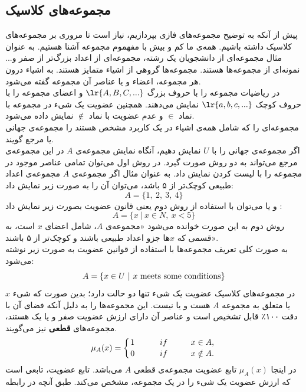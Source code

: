 \documentclass[12pt,a4paper]{article}
\theoremstyle{definition}
\begin{document}
 \subsection{مجموعه‌های کلاسیک}
پیش از آنکه به توضیح مجموعه‌های فازی بپردازیم، نیاز است تا مروری بر مجموعه‌های کلاسیک داشته باشیم. همه‌ی ما کم و بیش با مفهموم مجموعه آشنا هستیم. به عنوان مثال مجموعه‌ای از دانشجویان یک رشته، مجموعه‌ای از اعداد بزرگ‌تر از صفر و... نمونه‌ای از مجموعه‌ها هستند. مجموعه‌ها گروهی از اشیاء متمایز هستند. به اشیاء درون هر مجموعه، اعضاء و یا عناصر آن مجموعه گفته می‌شود. \\
در ریاضیات مجموعه را با حروف بزرگ 
$\lr{A,B,C,...}$
 و اعضای مجموعه را با حروف کوچک 
$\lr{a,b,c,...} $
  نمایش می‌دهند. همچنین عضویت یک شیء در مجموعه با نماد 
$\in$
 و عدم عضویت با نماد
 $\notin$
 نمایش داده می‌شود. 
 \cite{Bojadziev2007}
 \\
مجموعه‌ای را که شامل همه‌ی اشیاء در یک کاربرد مشخص هستند را مجموعه‌ی جهانی 
یا مرجع گویند. \\
اگر مجموعه‌ی جهانی را با $ U $  نمایش دهیم، آنگاه نمایش مجموعه‌ی $ A $  در این مجموعه‌ی مرجع می‌تواند به دو روش صورت گیرد. در روش اول می‌توان تمامی عناصر موجود در مجموعه را با لیست کردن 
نمایش داد. به عنوان مثال اگر مجموعه‌ی $ A $ مجموعه‌ی اعداد طبیعی کوچک‌تر از ۵ باشد، می‌توان آن را به صورت زیر نمایش داد:
$$ A=\{1,\ 2,\ 3,\ 4\} $$
و یا می‌توان با استفاده از روش دوم یعنی قانون عضویت
بصورت زیر نمایش داد
\cite{Wang1997}:
 $$A= \{ x\ |\ x \in N,\ x < 5\} $$
 روش دوم به این صورت خوانده می‌شود «مجموعه‌ی $ A $، شامل اعضای $ x $ است، به قسمی که  $ x $ها جزو اعداد طبیعی باشند و کوچک‌تر از ۵ باشند».\\
 به صورت کلی تعریف مجموعه‌ها با استفاده از قوانین عضویت به صورت زیر نوشته می‌شود:
\begin{equation}
 A= \{  x \in U\ |\   x\ {\rm meets\ some\ conditions } \}
 \end{equation} 
 در مجموعه‌های کلاسیک عضویت یک شیء تنها دو حالت دارد؛ بدین صورت که شیء $x$ یا متعلق به مجموعه $A$ هست و یا نیست. این مجموعه‌ها را به دلیل آنکه فضای آن با دقت ۱۰۰٪ قابل تشخیص است و عناصر آن دارای ارزش عضویت صفر و یا یک هستند، مجموعه‌های
  \textbf{قطعی}
  نیز می‌گویند. 
\begin{equation}\label{eq:e_classic_setdesc}
\mu_{A}(x)=\left \{ 
	{1 \atop 0}
	\hskip 1cm
   {if \hskip 1cm x \in A, \atop
	if \hskip 1cm x \notin A.} \right.
\end{equation} 
در اینجا
$\mu_{A}(x)$
 تابع عضویت مجموعه‌ی قطعی $A$ می‌باشد. تابع عضویت، تابعی است که ارزش عضویت یک شیء را در یک مجموعه، مشخص می‌کند. طبق آنچه در رابطه
\end{document}
